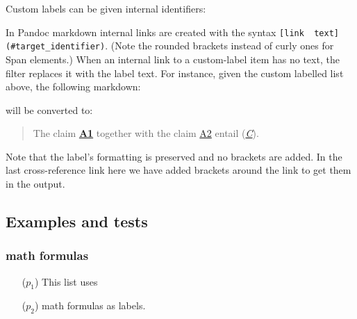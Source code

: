 Custom labels can be given internal identifiers:

\begin{Shaded}
\begin{Highlighting}[]
\SpecialStringTok{* }\CommentTok{[}\CommentTok{]}
\SpecialStringTok{* }\CommentTok{[}\CommentTok{]}
\SpecialStringTok{* }\CommentTok{[}\CommentTok{]}
\end{Highlighting}
\end{Shaded}

In Pandoc markdown internal links are created with the syntax
\texttt{{[}link\ \ text{]}(\#target\_identifier)}. (Note the rounded
brackets instead of curly ones for Span elements.) When an internal link
to a custom-label item has no text, the filter replaces it with the
label text. For instance, given the custom labelled list above, the
following markdown:

\begin{Shaded}
\begin{Highlighting}[]
\end{Highlighting}
\end{Shaded}

will be converted to:

\begin{quote}
The claim \href{}{\textbf{A1}} together with the claim \href{}{A2}
entail (\href{}{\emph{C}}).
\end{quote}

Note that the label's formatting is preserved and no brackets are added.
In the last cross-reference link here we have added brackets around the
link to get them in the output.

\hypertarget{examples-and-tests}{%
\subsection{Examples and tests}\label{examples-and-tests}}

\hypertarget{math-formulas}{%
\subsubsection{math formulas}\label{math-formulas}}

\begin{itemize}
\tightlist

\item[(\(p_1\))] This list uses

\item[(\(p_2\))] math formulas as labels.

\end{itemize}

